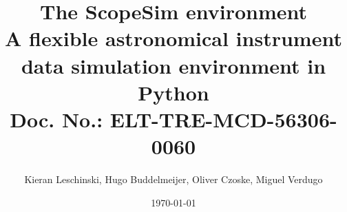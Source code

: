 \documentclass[a4paper,11pt]{article}
\providecommand*{\DUdocumentsubtitle}[1]{{\large #1}}
\begin{document}
\title{The ScopeSim environment%
  \label{title}%
  \\%
  \DUdocumentsubtitle{A flexible astronomical instrument data simulation environment in Python \\
    Doc. No.: ELT-TRE-MCD-56306-0060}%
  \label{subtitle}}
\author{Kieran Leschinski,
        Hugo Buddelmeijer,
        Oliver Czoske,
        Miguel Verdugo}
\date{\today}

\maketitle

\tableofcontents

















\end{document}
